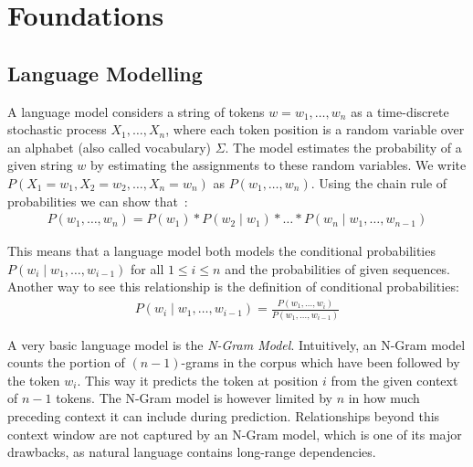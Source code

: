 
\chapter{Foundations}

\section{Language Modelling}

A language model considers a string of tokens $w = w_1, \ldots, w_n$ as a time-discrete stochastic process $X_1, \ldots, X_n$, where each token position is a random variable over an alphabet (also called vocabulary) $\Sigma$. The model estimates the probability of a given string $w$ by estimating the assignments to these random variables. We write $P(X_1 = w_1, X_2 = w_2, \ldots, X_n = w_n)$ as $P(w_1, \ldots, w_n)$.
Using the chain rule of probabilities we can show that~\cite{parsing2009speech}:
\begin{align*}
    P(w_1, \ldots, w_n) = P(w_1)*P(w_2 \mid w_1)*\ldots*P(w_n \mid w_1, \ldots, w_{n-1})
\end{align*}

\noindent This means that a language model both models the conditional probabilities $P(w_i \mid w_1, \ldots, w_{i-1})$ for all $1 \leq i \leq n$ and the probabilities of given sequences. Another way to see this relationship is the definition of conditional probabilities:
\begin{align*}
    P(w_i \mid w_1, \ldots, w_{i-1}) = \frac{P(w_1, \ldots, w_i)}{P(w_1, \ldots, w_{i-1})}
\end{align*}

A very basic language model is the \textit{N-Gram Model}.
Intuitively, an N-Gram model counts the portion of $(n-1)$-grams in the corpus which have been followed by the token $w_i$. This way it predicts the token at position $i$ from the given context of $n-1$ tokens. The N-Gram model is however limited by $n$ in how much preceding context it can include during prediction. Relationships beyond this context window are not captured by an N-Gram model, which is one of its major drawbacks, as natural language contains long-range dependencies.

